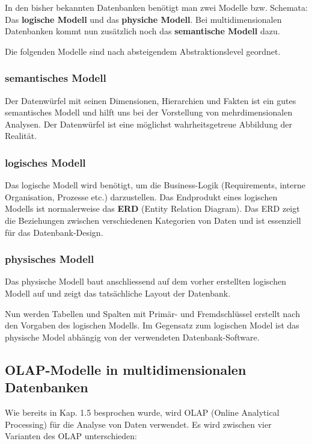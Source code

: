 \documentclass[a4paper, 11pt, nofootinbib]{article}
\begin{document}
In den bisher bekannten Datenbanken benötigt man zwei Modelle bzw. Schemata: Das \textbf{logische Modell} und das \textbf{physiche Modell}. Bei multidimensionalen Datenbanken kommt nun zusätzlich noch das \textbf{semantische Modell} dazu.

Die folgenden Modelle sind nach absteigendem Abstraktionslevel geordnet.

\subsubsection{semantisches Modell}
Der Datenwürfel mit seinen Dimensionen, Hierarchien und Fakten ist ein gutes semantisches Modell und hilft uns bei der Vorstellung von mehrdimensionalen Analysen. Der Datenwürfel ist eine möglichst wahrheitsgetreue Abbildung der Realität.

\subsubsection{logisches Modell}
Das logische Modell wird benötigt, um die Business-Logik (Requirements, interne Organisation, Prozesse etc.) darzustellen. Das Endprodukt eines logischen Modells ist normalerweise das \textbf{ERD} (Entity Relation Diagram). Das ERD zeigt die Beziehungen zwischen verschiedenen Kategorien von Daten und ist essenziell für das Datenbank-Design. 

\subsubsection{physisches Modell}
Das physische Modell baut anschliessend auf dem vorher erstellten logischen Modell auf und zeigt das tatsächliche Layout der Datenbank.

Nun werden Tabellen und Spalten mit Primär- und Fremdschlüssel erstellt nach den Vorgaben des logischen Modells. Im Gegensatz zum logischen Model ist das physische Model abhängig von der verwendeten Datenbank-Software.


\subsection{OLAP-Modelle in multidimensionalen Datenbanken}
Wie bereits in Kap. 1.5 besprochen wurde, wird OLAP (Online Analytical Processing) für die Analyse von Daten verwendet. Es wird zwischen vier Varianten des OLAP unterschieden:
\end{document}
